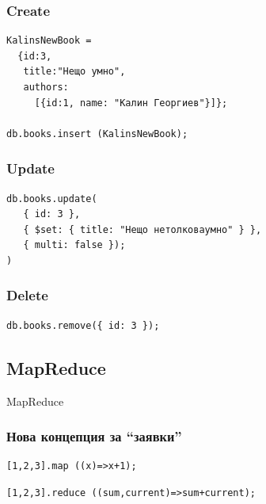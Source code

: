 \documentclass{beamer}
\begin{document}
\begin{frame}[fragile]
\frametitle{Create}

\begin{lstlisting}
KalinsNewBook =
  {id:3,
   title:"Нещо умно",
   authors:
     [{id:1, name: "Калин Георгиев"}]};

db.books.insert (KalinsNewBook);
\end{lstlisting}


\end{frame}


\begin{frame}[fragile]
\frametitle{Update}

\begin{lstlisting}
db.books.update(
   { id: 3 },
   { $set: { title: "Нещо нетолковаумно" } },
   { multi: false });
)\end{lstlisting}


\end{frame}

\begin{frame}[fragile]
\frametitle{Delete}

\begin{lstlisting}
db.books.remove({ id: 3 });
\end{lstlisting}


\end{frame}

\subsection{MapReduce}

\begin{frame}
\centerline{MapReduce}
\end{frame}


\begin{frame}[fragile]
\frametitle{Нова концепция за ``заявки''}


\lstset{language=JavaScript}



\begin{lstlisting}
[1,2,3].map ((x)=>x+1);
\end{lstlisting}

\vspace{0.2cm}
\pause

\begin{lstlisting}
[1,2,3].reduce ((sum,current)=>sum+current);
\end{lstlisting}


\end{frame}
\end{document}
